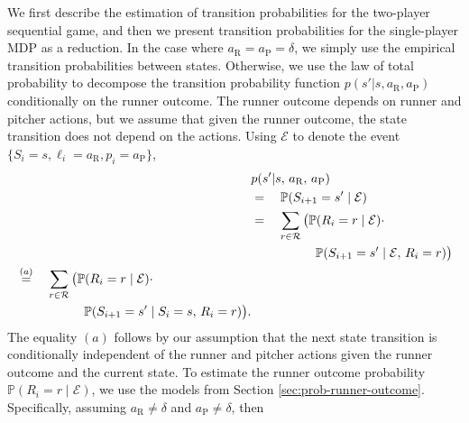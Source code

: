 \documentclass[opre,dblanonrev]{informs4}
\begin{document}
      We first describe the estimation of transition probabilities for the two-player sequential game, and then we present transition probabilities for the single-player MDP as a reduction. In the case where $a_\text{R} = a_\text{P} = \delta$, we simply use the empirical transition probabilities between states. Otherwise, we use the law of total probability to decompose the transition probability function $p(s'|s,a_\text{R},a_\text{P})$ conditionally on the runner outcome. The runner outcome depends on runner and pitcher actions, but we assume that given the runner outcome, the state transition does not depend on the actions. Using $\mathcal{E}$ to denote the event $\{S_i = s, \ell_i = a_\text{R}, p_i = a_\text{P}\}$,
      \begin{align}
        \label{eqn:prob-state-transition-two-player}
          & p(s'|s,\, a_\text{R},\, a_\text{P}) \notag\\
          &=\quad \mathbb{P}(S_{i+1} = s' \mid \mathcal{E}) \notag\\
          &=\quad \sum_{r \in \mathcal{R}} \big(\mathbb{P}(R_i = r \mid \mathcal{E}) \cdot \notag\\
          &\hspace{18mm} \mathbb{P}(S_{i+1} = s' \mid \mathcal{E},\, R_i = r)\big) \notag\\
          \begin{split}
            &\stackrel{(a)}=\quad \sum_{r \in \mathcal{R}} \big( \mathbb{P}(R_i = r \mid \mathcal{E}) \cdot\\
            &\hspace{19mm} \mathbb{P}(S_{i+1} = s' \mid S_i = s,\, R_i = r) \big).
          \end{split}
      \end{align}
      The equality $(a)$ follows by our assumption that the next state transition is conditionally independent of the runner and pitcher actions given the runner outcome and the current state. To estimate the runner outcome probability $\mathbb{P}(R_i = r \mid \mathcal{E})$, we use the models from Section \ref{sec:prob-runner-outcome}. Specifically, assuming $a_\text{R} \ne \delta$ and $a_\text{P} \ne \delta$, then
\end{document}

